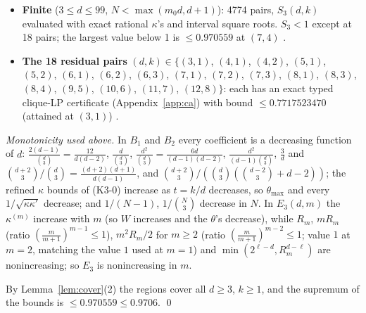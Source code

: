\documentclass[11pt]{article}
\theoremstyle{definition}
\theoremstyle{remark}
\begin{document}
\begin{itemize}
.
\item \textbf{Finite} ($3\le d\le99$, $N<\max(m_0d,d+1)$): 4774 pairs, $S_3(d,k)$ evaluated with exact rational $\kappa$'s and interval square roots.
$S_3<1$ except at 18 pairs; the largest value below 1 is $\le0.970559$ at $(7,4)$ .
\item \textbf{The 18 residual pairs} $(d,k)\in\{(3,1)$, $(4,1)$, $(4,2)$, $(5,1)$, $(5,2)$, $(6,1)$, $(6,2)$, $(6,3)$, $(7,1)$, $(7,2)$, $(7,3)$, $(8,1)$, $(8,3)$, $(8,4)$, $(9,5)$, $(10,6)$, $(11,7)$, $(12,8)\}$:
each has an exact typed clique-LP certificate (Appendix~\ref{app:ca}) with bound $\le0.7717523470$ (attained at $(3,1)$) .
\end{itemize}
\emph{Monotonicity used above.} In $B_1$ and $B_2$ every coefficient is a decreasing function of $d$: $\frac{2(d-1)}{\binom d3}=\frac{12}{d(d-2)}$,
$\frac d{\binom d3}$, $\frac{d^2}{\binom d3}=\frac{6d}{(d-1)(d-2)}$, $\frac{d^2}{(d-1)\binom d3}$, $\frac3d$ and $\binom{d+2}3/\binom d3=\frac{(d+2)(d+1)}{d(d-1)}$, and
$\binom{d+2}{3}/(\binom d3(\binom{d-2}3+d-2))$; the refined $\kappa$ bounds of (K3-0) increase as $t=k/d$ decreases, so $\theta_{\max}$ and every
$1/\sqrt{\kappa\kappa'}$ decrease; and $1/(N-1)$, $1/\binom N3$ decrease in $N$. In $E_3(d,m)$ the $\kappa^{(m)}$ increase with $m$ (so $W$ increases and
the $\theta$'s decrease), while $R_m$, $mR_m$ (ratio $(\frac m{m+1})^{m-1}\le1$), $m^2R_m/2$ for $m\ge2$ (ratio $(\frac m{m+1})^{m-2}\le1$; value $1$ at
$m=2$, matching the value $1$ used at $m=1$) and $\min(2^{\ell-d},R_m^{d-\ell})$ are nonincreasing; so $E_3$ is nonincreasing in $m$.

By Lemma~\ref{lem:cover}(2) the regions cover all $d\ge3$, $k\ge1$, and the supremum of the bounds is $\le0.970559\le0.9706$. \qed
\end{document}
